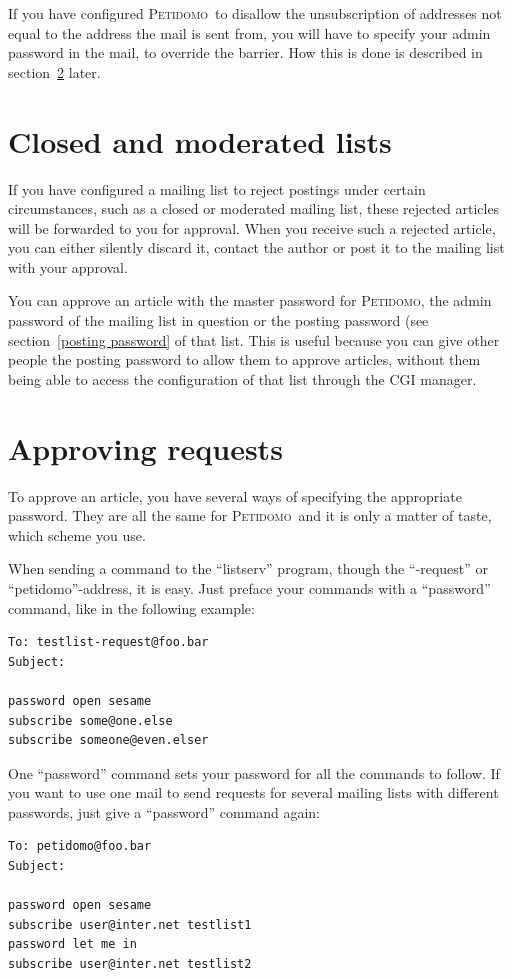 \documentclass[a4paper]{report}
\newcommand{\Petidomo}{{\scshape Peti\-domo}}
\newcommand{\Index}[1]{#1\index{#1}}
\begin{document}
If you have configured \Petidomo\ to disallow the unsubscription of
addresses not equal to the address the mail is sent from, you will
have to specify your admin password in the mail, to override the
barrier. How this is done is described in section~\ref{approve} later.

\section{Closed and moderated lists}

If you have configured a mailing list to reject postings under certain
circumstances, such as a closed or moderated mailing list, these
rejected articles will be forwarded to you for approval. When you
receive such a \Index{rejected article}, you can either silently
discard it, contact the author or post it to the mailing list with
your approval.

You can approve an article with the master password for \Petidomo, the
admin password of the mailing list in question or the posting password
(see section~\ref{posting password} of that list. This is useful
because you can give other people the posting password to allow them
to approve articles, without them being able to access the
configuration of that list through the CGI manager.

\section{Approving requests}
\label{approve}

To approve an article, you have several ways of specifying the
appropriate password. They are all the same for \Petidomo\ and it is
only a matter of taste, which scheme you use.

When sending a command to the ``listserv'' program, though the
``-request'' or ``petidomo''-address, it is easy. Just preface your
commands with a ``password'' command, like in the
following example:
\begin{verbatim}
To: testlist-request@foo.bar
Subject:

password open sesame
subscribe some@one.else
subscribe someone@even.elser
\end{verbatim}

One ``password'' command sets your password for all the commands to
follow. If you want to use one mail to send requests for several
mailing lists with different passwords, just give a ``password''
command again:
\begin{verbatim}
To: petidomo@foo.bar
Subject:

password open sesame
subscribe user@inter.net testlist1
password let me in
subscribe user@inter.net testlist2
\end{verbatim}
\end{document}
